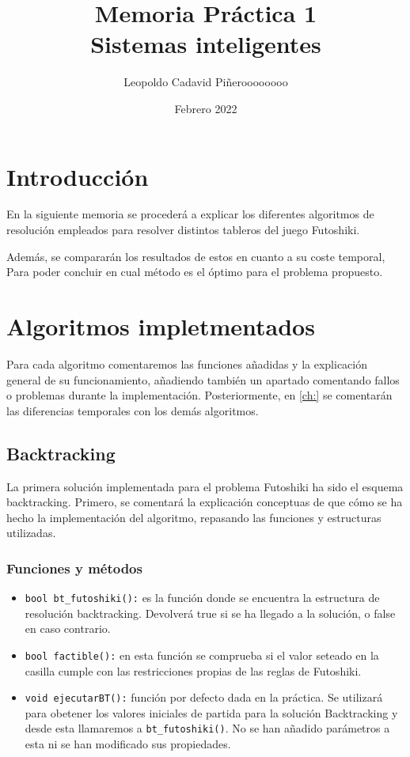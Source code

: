 \documentclass[12pt]{article}
\title{Memoria Práctica 1 \\


\large Sistemas inteligentes
}
\author{
Leopoldo Cadavid Piñeroooooooo
}
\date{Febrero 2022}
\begin{document}
\maketitle
\newpage
\tableofcontents
\newpage
\section{Introducción}

      En la siguiente memoria se procederá a explicar los diferentes algoritmos de resolución
      empleados para resolver distintos tableros del juego Futoshiki.

      Además, se compararán los resultados de estos en cuanto a su coste temporal,
      Para poder concluir en cual método es el óptimo para el problema propuesto. 
      

\section{Algoritmos impletmentados}
Para cada algoritmo comentaremos las funciones añadidas y la explicación general de su funcionamiento, añadiendo también un apartado comentando fallos o
problemas durante la implementación. Posteriormente, en \ref*{ch:} se comentarán las diferencias temporales 
con los demás algoritmos.

\subsection{Backtracking}
La primera solución implementada para el problema Futoshiki ha sido el 
esquema backtracking. Primero, se comentará la explicación conceptuas de que cómo se ha hecho la implementación
del algoritmo, repasando las funciones y estructuras utilizadas. 
\subsubsection{Funciones y métodos}



\begin{itemize}

    \item \verb|bool bt_futoshiki():| es la función donde se encuentra la estructura
     de resolución backtracking. Devolverá true si se ha llegado a la solución, o false 
     en caso contrario. 

    \item \verb|bool factible():| en esta función se comprueba si el valor 
    seteado en la casilla cumple con las restricciones propias de las reglas de Futoshiki.

    \item \verb|void ejecutarBT():| función por defecto dada en la práctica. Se utilizará
    para obetener los valores iniciales de partida para la solución Backtracking
    y desde esta llamaremos a \verb|bt_futoshiki()|. No se han añadido parámetros a esta ni se han 
    modificado sus propiedades.

    
\end{itemize}
\end{document}
